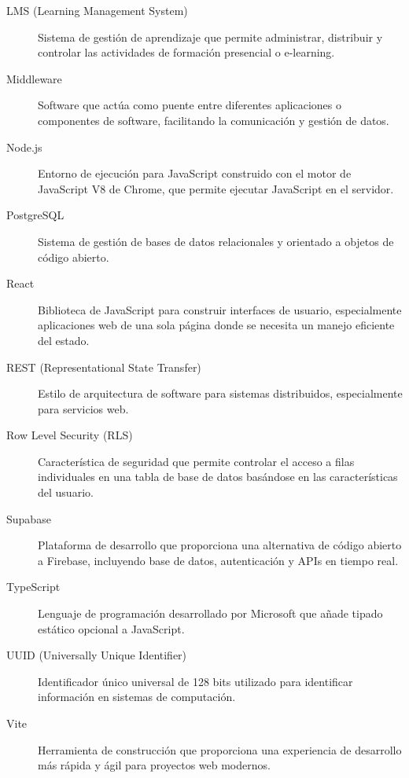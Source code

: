 \documentclass[12pt,a4paper]{report}
\begin{document}
\begin{description}
\item[LMS (Learning Management System)] Sistema de gestión de aprendizaje que permite administrar, distribuir y controlar las actividades de formación presencial o e-learning.

\item[Middleware] Software que actúa como puente entre diferentes aplicaciones o componentes de software, facilitando la comunicación y gestión de datos.

\item[Node.js] Entorno de ejecución para JavaScript construido con el motor de JavaScript V8 de Chrome, que permite ejecutar JavaScript en el servidor.

\item[PostgreSQL] Sistema de gestión de bases de datos relacionales y orientado a objetos de código abierto.

\item[React] Biblioteca de JavaScript para construir interfaces de usuario, especialmente aplicaciones web de una sola página donde se necesita un manejo eficiente del estado.

\item[REST (Representational State Transfer)] Estilo de arquitectura de software para sistemas distribuidos, especialmente para servicios web.

\item[Row Level Security (RLS)] Característica de seguridad que permite controlar el acceso a filas individuales en una tabla de base de datos basándose en las características del usuario.

\item[Supabase] Plataforma de desarrollo que proporciona una alternativa de código abierto a Firebase, incluyendo base de datos, autenticación y APIs en tiempo real.

\item[TypeScript] Lenguaje de programación desarrollado por Microsoft que añade tipado estático opcional a JavaScript.

\item[UUID (Universally Unique Identifier)] Identificador único universal de 128 bits utilizado para identificar información en sistemas de computación.

\item[Vite] Herramienta de construcción que proporciona una experiencia de desarrollo más rápida y ágil para proyectos web modernos.
\end{description}
\end{document}
